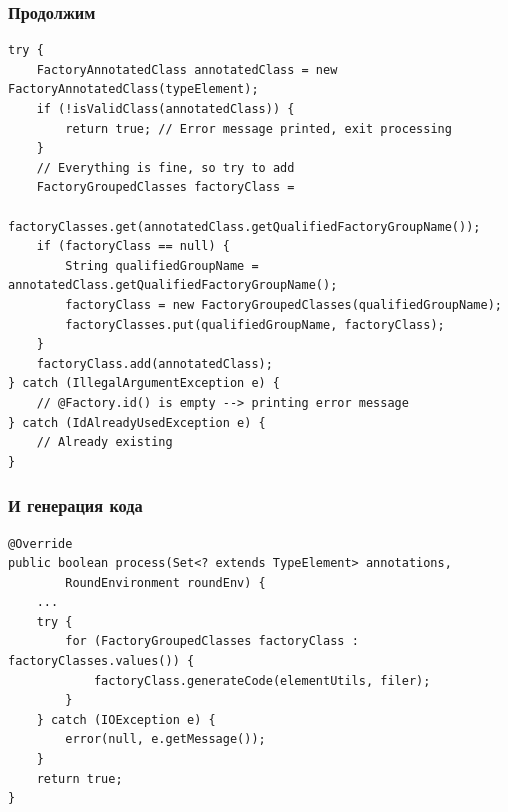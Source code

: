 \documentclass[xetex,mathserif,serif]{beamer}
\begin{document}
	\begin{frame}[fragile]
		\frametitle{Продолжим}
		\begin{footnotesize}
			\begin{verbatim}
try {
    FactoryAnnotatedClass annotatedClass = new FactoryAnnotatedClass(typeElement);
    if (!isValidClass(annotatedClass)) {
        return true; // Error message printed, exit processing
    }
    // Everything is fine, so try to add
    FactoryGroupedClasses factoryClass =
            factoryClasses.get(annotatedClass.getQualifiedFactoryGroupName());
    if (factoryClass == null) {
        String qualifiedGroupName = annotatedClass.getQualifiedFactoryGroupName();
        factoryClass = new FactoryGroupedClasses(qualifiedGroupName);
        factoryClasses.put(qualifiedGroupName, factoryClass);
    }
    factoryClass.add(annotatedClass);
} catch (IllegalArgumentException e) {
    // @Factory.id() is empty --> printing error message
} catch (IdAlreadyUsedException e) {
    // Already existing
}
			\end{verbatim}
		\end{footnotesize}
	\end{frame}

	\begin{frame}[fragile]
		\frametitle{И генерация кода}
		\begin{footnotesize}
			\begin{verbatim}
@Override
public boolean process(Set<? extends TypeElement> annotations, 
        RoundEnvironment roundEnv) {
    ...
    try {
        for (FactoryGroupedClasses factoryClass : factoryClasses.values()) {
            factoryClass.generateCode(elementUtils, filer);
        }
    } catch (IOException e) {
        error(null, e.getMessage());
    }
    return true;
}
			\end{verbatim}
		\end{footnotesize}
	\end{frame}
\end{document}
